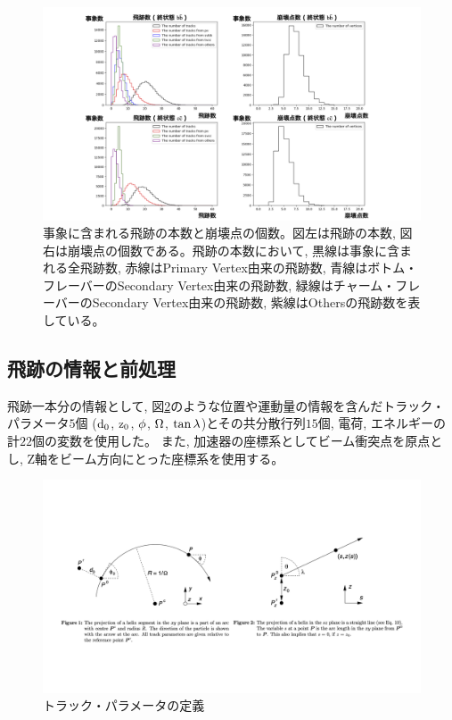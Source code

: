 \begin{figure}[htbp]
 \centering
 \includegraphics[trim = 150 0 150 0, width=1.0\textwidth, clip]{Figure/3Networks/3-1-1-2TracksandVertices.png}
 \caption[事象に含まれる飛跡の本数と崩壊点の個数]{事象に含まれる飛跡の本数と崩壊点の個数。図左は飛跡の本数, 図右は崩壊点の個数である。飛跡の本数において, 黒線は事象に含まれる全飛跡数, 赤線はPrimary Vertex由来の飛跡数, 青線はボトム・フレーバーのSecondary Vertex由来の飛跡数, 緑線はチャーム・フレーバーのSecondary Vertex由来の飛跡数, 紫線はOthersの飛跡数を表している。}
 \label{3-1-1-2TracksandVertices}
\end{figure}


\subsection{飛跡の情報と前処理} \label{Net:Data:TrackInformationandPreprocessing}

飛跡一本分の情報として, 図\ref{3-1-2-1TrackParameters}のような位置や運動量の情報を含んだトラック・パラメータ$5$個 ($\rm d_0$, $\rm z_0$, $\rm \phi$, $\rm \Omega$, $\rm \tan{\lambda}$)\cite{TrackParametersLCIO}とその共分散行列$15$個, 電荷, エネルギーの計$22$個の変数を使用した。
また, 加速器の座標系としてビーム衝突点を原点とし, Z軸をビーム方向にとった座標系を使用する。

\begin{figure}[htbp]
 \centering
 \includegraphics[trim = 50 150 50 250, width=1.0\textwidth, clip]{Figure/3Networks/3-1-2-1TrackParameters.png}
 \caption[トラック・パラメータの定義]{トラック・パラメータの定義\cite{TrackParametersLCIO}}
 \label{3-1-2-1TrackParameters}
\end{figure}

